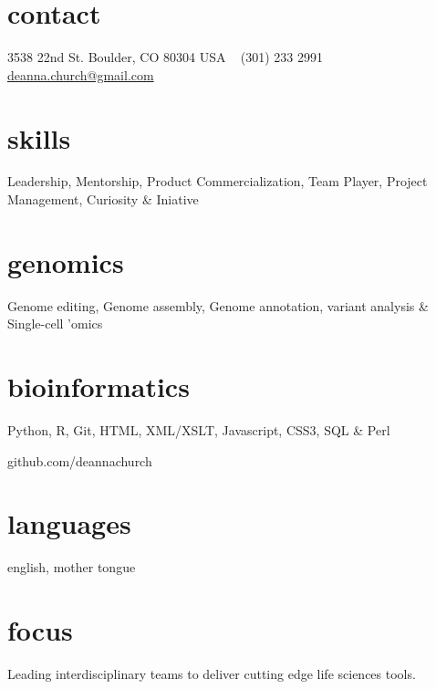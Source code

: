 \documentclass[]{dmc-cv} %
\begin{document}


\begin{aside} %
\section{contact}
3538 22nd St.
Boulder, CO 80304
USA
~
(301) 233 2991
~
\href{mailto:deanna.church@gmail.com}{deanna.church@gmail.com}
\section{skills}
Leadership, Mentorship,
Product Commercialization,
Team Player,
Project Management,
Curiosity \& Iniative
\section{genomics}
Genome editing,
Genome assembly,
Genome annotation,
variant analysis \&
Single-cell 'omics
\section{bioinformatics}
Python, R, Git,
HTML, XML/XSLT, Javascript,
CSS3, SQL \& Perl

github.com/deannachurch

\section{languages}
english, mother tongue
\end{aside}

\section{focus}
Leading interdisciplinary teams to deliver cutting edge life sciences tools.

\end{document}
